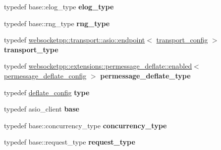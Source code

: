 \begin{DoxyCompactItemize}
\item 
\mbox{\label{structdeflate__config_a222cf9d7a150c9c9b72b85f08fd523ba}} 
typedef base\+::elog\+\_\+type {\bfseries elog\+\_\+type}
\item 
\mbox{\label{structdeflate__config_a89e44adf18198ce8594722ad54b327cd}} 
typedef base\+::rng\+\_\+type {\bfseries rng\+\_\+type}
\item 
\mbox{\label{structdeflate__config_a1df9e5f910e409686de46819564a10ec}} 
typedef \mbox{\hyperlink{classwebsocketpp_1_1transport_1_1asio_1_1endpoint}{websocketpp\+::transport\+::asio\+::endpoint}}$<$ \mbox{\hyperlink{structdeflate__config_1_1transport__config}{transport\+\_\+config}} $>$ {\bfseries transport\+\_\+type}
\item 
\mbox{\label{structdeflate__config_a17f7c627557e905cab80c4cc7c016a30}} 
typedef \mbox{\hyperlink{classwebsocketpp_1_1extensions_1_1permessage__deflate_1_1enabled}{websocketpp\+::extensions\+::permessage\+\_\+deflate\+::enabled}}$<$ \mbox{\hyperlink{structdeflate__config_1_1permessage__deflate__config}{permessage\+\_\+deflate\+\_\+config}} $>$ {\bfseries permessage\+\_\+deflate\+\_\+type}
\item 
\mbox{\label{structdeflate__config_ae5de21f2afdd167fdf3642d312730044}} 
typedef \mbox{\hyperlink{structdeflate__config}{deflate\+\_\+config}} {\bfseries type}
\item 
\mbox{\label{structdeflate__config_af0bb3aa0c35de850452b46d6f75eaa6a}} 
typedef asio\+\_\+client {\bfseries base}
\item 
\mbox{\label{structdeflate__config_a102a1217cfcc29b0fdbce3274f24f1f0}} 
typedef base\+::concurrency\+\_\+type {\bfseries concurrency\+\_\+type}
\item 
\mbox{\label{structdeflate__config_a9e3ad39bfeac4d3019ec11a258cc7e97}} 
typedef base\+::request\+\_\+type {\bfseries request\+\_\+type}
\item 
\mbox{\label{structdeflate__config_aa833af0fcc5ecab6384efddb10ba2973}} 

\end{DoxyCompactItemize}
